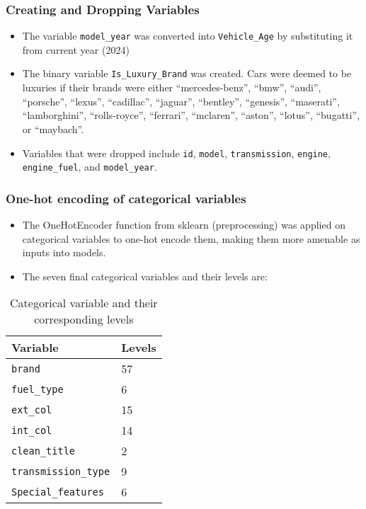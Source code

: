 \documentclass{article}
\begin{document}
\subsubsection{Creating and Dropping Variables}

\begin{itemize}
   \item The variable \texttt{model\_year} was converted into \texttt{Vehicle\_Age} by substituting it from current year (2024)

   \item The binary variable \texttt{Is\_Luxury\_Brand} was created. Cars were deemed to be luxuries if their brands were either ``mercedes-benz'', ``bmw'', ``audi'', ``porsche'', ``lexus'', ``cadillac'', ``jaguar'', ``bentley'', ``genesis'', ``maserati'', ``lamborghini'', ``rolls-royce'', ``ferrari'', ``mclaren'', ``aston'', ``lotus'', ``bugatti'', or ``maybach''.

   \item Variables that were dropped include \texttt{id}, \texttt{model}, \texttt{transmission}, \texttt{engine}, \texttt{engine\_fuel}, and \texttt{model\_year}.
\end{itemize}

\subsubsection{One-hot encoding of categorical variables}

\begin{itemize}
   \item The OneHotEncoder function from sklearn (preprocessing) was applied on categorical variables to one-hot encode them, making them more amenable as inputs into models.
   
   \item The seven final categorical variables and their levels are:
\end{itemize}
\begin{table}[h]
   \centering
   \caption{Categorical variable and their corresponding levels}
   \label{tab:categorical_vars}
   \begin{tabular}{ll}
       \hline
       Variable & Levels \\
       \hline
       \texttt{brand} & 57 \\
       \texttt{fuel\_type} & 6 \\
       \texttt{ext\_col} & 15 \\
       \texttt{int\_col} & 14 \\
       \texttt{clean\_title} & 2 \\
       \texttt{transmission\_type} & 9 \\
       \texttt{Special\_features} & 6 \\
       \hline
   \end{tabular}
\end{table}
\end{document}
